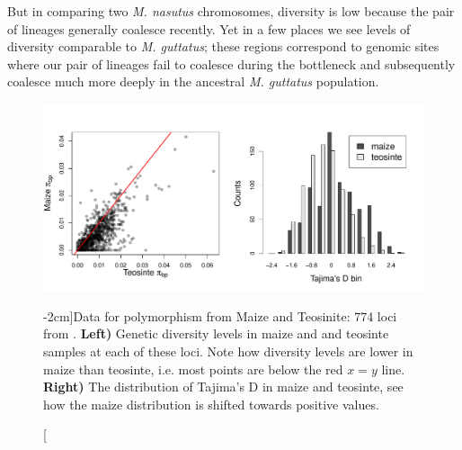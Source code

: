  But in comparing two {\it
  M. nasutus} chromosomes, diversity is low because the pair of lineages generally coalesce
recently. Yet in a few places we see levels of diversity comparable to
{\it M. guttatus}; these regions correspond to genomic sites where our pair of lineages
fail to coalesce during the bottleneck and subsequently coalesce
much more deeply in the ancestral {\it M. guttatus} population.
\begin{figure}
\begin{center}
  \includegraphics[width = \textwidth]{Journal_figs/genetic_drift/Maize_bottleneck/Wright_Tajima_D.pdf}
\end{center}
\caption[][-2cm]{Data for polymorphism from Maize and Teosinite: 774
  loci from \citet{Wright:05}. {\bf Left)} Genetic  diversity levels in maize and and teosinte samples at each of these loci.
Note how diversity levels are lower in maize than teosinte, i.e. most
points are below the red $x=y$ line. {\bf Right)} The distribution of Tajima's D in maize and teosinte, see how the maize distribution is shifted towards positive values.  } \label{fig:maize_Tajimas_D}  %
\end{figure}

